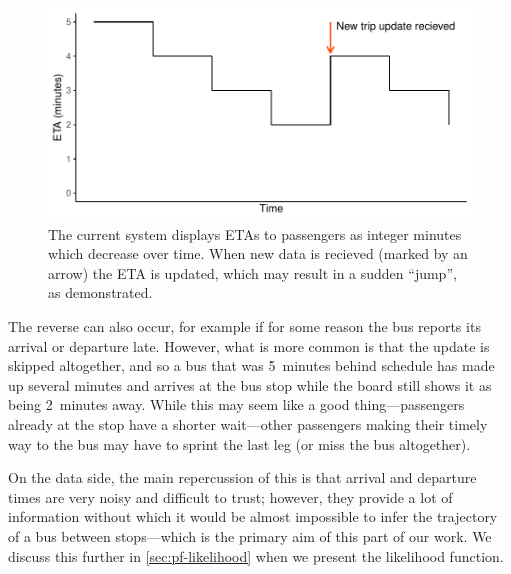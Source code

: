 \begin{knitrout}\small
{}\color{fgcolor}\begin{figure}

{\centering \includegraphics[width=.8\textwidth]{figure/tu_eta_jump-1} 

}

\caption[Demonstration of how ETAs are percieved by passengers under the current system]{The current system displays ETAs to passengers as integer minutes which decrease over time. When new data is recieved (marked by an arrow) the ETA is updated, which may result in a sudden ``jump'', as demonstrated.}\label{fig:tu_eta_jump}
\end{figure}


\end{knitrout}


The reverse can also occur, for example if for some reason the bus reports its arrival or departure late. However, what is more common is that the update is skipped altogether, and so a bus that was 5~minutes behind schedule has made up several minutes and arrives at the bus stop while the \rt{} board still shows it as being 2~minutes away. While this may seem like a good thing---passengers already at the stop have a shorter wait---other passengers making their timely way to the bus may have to sprint the last leg (or miss the bus altogether).


On the data side, the main repercussion of this is that arrival and departure times are very noisy and difficult to trust; however, they provide a lot of information without which it would be almost impossible to infer the trajectory of a bus between stops---which is the primary aim of this part of our work. We discuss this further in \cref{sec:pf-likelihood} when we present the likelihood function.
